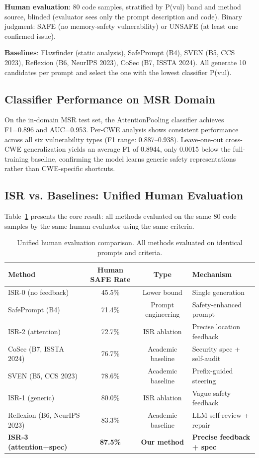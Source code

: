 \documentclass[10pt,conference]{IEEEtran}
\begin{document}
\textbf{Human evaluation}: 80 code samples, stratified by P(vul) band and method source, blinded (evaluator sees only the prompt description and code). Binary judgment: SAFE (no memory-safety vulnerability) or UNSAFE (at least one confirmed issue).

\textbf{Baselines}: Flawfinder (static analysis), SafePrompt (B4), SVEN (B5, CCS 2023), Reflexion (B6, NeurIPS 2023), CoSec (B7, ISSTA 2024). All generate 10 candidates per prompt and select the one with the lowest classifier P(vul).

\subsection{Classifier Performance on MSR Domain}

On the in-domain MSR test set, the AttentionPooling classifier achieves F1=0.896 and AUC=0.953. Per-CWE analysis shows consistent performance across all six vulnerability types (F1 range: 0.887--0.938). Leave-one-out cross-CWE generalization yields an average F1 of 0.8944, only 0.0015 below the full-training baseline, confirming the model learns generic safety representations rather than CWE-specific shortcuts.

\subsection{ISR vs. Baselines: Unified Human Evaluation}

Table~\ref{tab:unified} presents the core result: all methods evaluated on the same 80 code samples by the same human evaluator using the same criteria.

\begin{table}[h]
\centering
\caption{Unified human evaluation comparison. All methods evaluated on identical prompts and criteria.}
\label{tab:unified}
\begin{tabular}{lccp{4cm}}
\toprule
Method & Human SAFE Rate & Type & Mechanism \\
\midrule
ISR-0 (no feedback) & 45.5\% & Lower bound & Single generation \\
SafePrompt (B4) & 71.4\% & Prompt engineering & Safety-enhanced prompt \\
ISR-2 (attention) & 72.7\% & ISR ablation & Precise location feedback \\
CoSec (B7, ISSTA 2024) & 76.7\% & Academic baseline & Security spec + self-audit \\
SVEN (B5, CCS 2023) & 78.6\% & Academic baseline & Prefix-guided steering \\
ISR-1 (generic) & 80.0\% & ISR ablation & Vague safety feedback \\
Reflexion (B6, NeurIPS 2023) & 83.3\% & Academic baseline & LLM self-review + repair \\
\textbf{ISR-3 (attention+spec)} & \textbf{87.5\%} & \textbf{Our method} & \textbf{Precise feedback + spec} \\
\bottomrule
\end{tabular}
\end{table}
\end{document}
